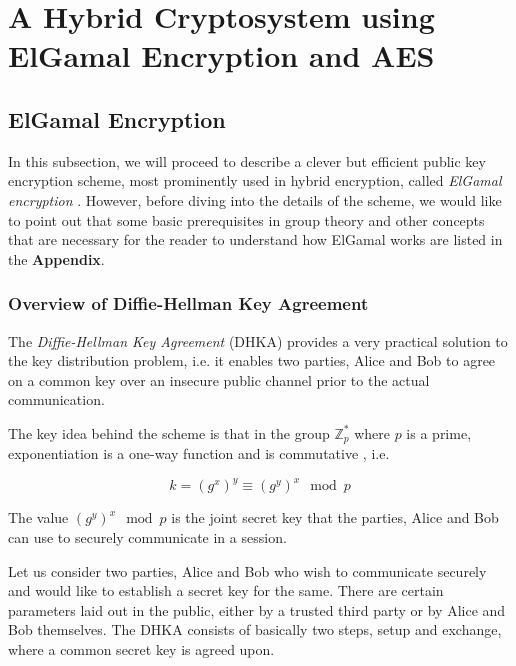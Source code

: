 \section{A Hybrid Cryptosystem using ElGamal Encryption and AES}

\label{sec:elgamal} 

\subsection{ElGamal Encryption}
In this subsection, we will proceed to describe a clever but efficient public key encryption scheme, most prominently used in hybrid encryption, called \textit{ElGamal encryption} \textsuperscript{\cite{Elgamal_1985}}. 
However, before diving into the details of the scheme, we would like to point out that some basic prerequisites in group theory and other concepts that are necessary for the reader to understand how ElGamal works are listed in the \textbf{Appendix}.

\subsubsection{Overview of Diffie-Hellman Key Agreement}

\label{subsec:dhka} 

The \emph{Diffie-Hellman Key Agreement} (DHKA) provides a very practical solution to the key distribution problem, i.e. it enables two parties, Alice and Bob to agree on a common key over an insecure public channel prior to the actual communication.

The key idea behind the scheme is that in the group \( \mathbb{Z}^*_p \) where \( p \) is a prime, exponentiation is a one-way function and is commutative \cite{paar2009understanding}, i.e.

\begin{equation}
    k = (g^x)^y \equiv (g^y)^x \mod p
\end{equation}

The value \( (g^y)^x \mod p \) is the joint secret key that the parties, Alice and Bob can use to securely communicate in a session.

Let us consider two parties, Alice and Bob who wish to communicate securely and would like to establish a secret key for the same. 
There are certain parameters laid out in the public, either by a trusted third party or by Alice and Bob themselves. 
The DHKA consists of basically two steps, setup and exchange, where a common secret key is agreed upon.

